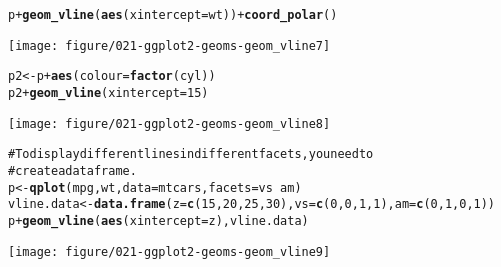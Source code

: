 \documentclass[a4paper,titlepage]{tufte-handout}\usepackage{graphicx, color}
\makeatletter
\def\maxwidth{ %
  \ifdim\Gin@nat@width>\linewidth
    \linewidth
  \else
    \Gin@nat@width
  \fi
}
\newcommand{\hlfunctioncall}[1]{\textcolor[rgb]{0.501960784313725,0,0.329411764705882}{\textbf{#1}}}%
\newcommand{\hlcomment}[1]{\textcolor[rgb]{0.180392156862745,0.6,0.341176470588235}{#1}}%
\newenvironment{kframe}{%
 \def\at@end@of@kframe{}%
 \ifinner\ifhmode%
  \def\at@end@of@kframe{\end{minipage}}%
  \begin{minipage}{\columnwidth}%
 \fi\fi%
 \def\FrameCommand##1{\hskip\@totalleftmargin \hskip-\fboxsep
 \colorbox{shadecolor}{##1}\hskip-\fboxsep
     \hskip-\linewidth \hskip-\@totalleftmargin \hskip\columnwidth}%
 \MakeFramed {\advance\hsize-\width
   \@totalleftmargin\z@ \linewidth\hsize
   \@setminipage}}%
 {\par\unskip\endMakeFramed%
 \at@end@of@kframe}
\newenvironment{knitrout}{}{} %
\makeatother
\begin{document}
\begin{knitrout}
\begin{kframe}
\begin{alltt}
p + \hlfunctioncall{geom_vline}(\hlfunctioncall{aes}(xintercept = wt)) + \hlfunctioncall{coord_polar}()
\end{alltt}
\end{kframe}\texttt{[image: figure/021-ggplot2-geoms-geom\_vline7]} \begin{kframe}\begin{alltt}
p2 <- p + \hlfunctioncall{aes}(colour = \hlfunctioncall{factor}(cyl))
p2 + \hlfunctioncall{geom_vline}(xintercept = 15)
\end{alltt}
\end{kframe}\texttt{[image: figure/021-ggplot2-geoms-geom\_vline8]} \begin{kframe}\begin{alltt}
\hlcomment{# To display different lines in different facets, you need to}
\hlcomment{# create a data frame.}
p <- \hlfunctioncall{qplot}(mpg, wt, data=mtcars, facets = vs ~ am)
vline.data <- \hlfunctioncall{data.frame}(z = \hlfunctioncall{c}(15, 20, 25, 30), vs = \hlfunctioncall{c}(0, 0, 1, 1), am = \hlfunctioncall{c}(0, 1, 0, 1))
p + \hlfunctioncall{geom_vline}(\hlfunctioncall{aes}(xintercept = z), vline.data)
\end{alltt}
\end{kframe}\texttt{[image: figure/021-ggplot2-geoms-geom\_vline9]} 
\end{knitrout}
\end{document}
